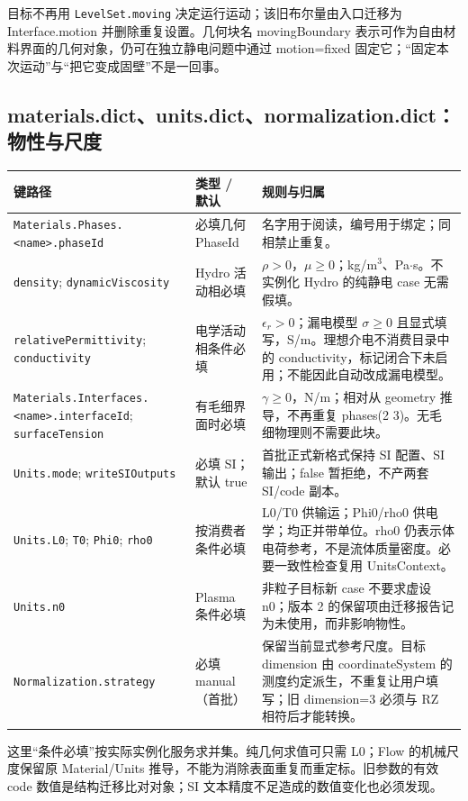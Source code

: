 \documentclass[UTF8,a4paper,11pt,fontset=fandol]{ctexart}
\numberwithin{equation}{section}
\newcommand{\code}[1]{\nolinkurl{#1}}
\begin{document}
目标不再用 \code{LevelSet.moving} 决定运行运动；该旧布尔量由入口迁移为 Interface.motion 并删除重复设置。几何块名 movingBoundary 表示可作为自由材料界面的几何对象，仍可在独立静电问题中通过 motion=fixed 固定它；“固定本次运动”与“把它变成固壁”不是一回事。

\subsection{materials.dict、units.dict、normalization.dict：物性与尺度}
\begin{longtable}{@{}P{.36\textwidth}P{.23\textwidth}P{.35\textwidth}@{}}
\toprule 键路径 & 类型 / 默认 & 规则与归属\\\midrule\endhead
\code{Materials.Phases.<name>.phaseId} & 必填几何 PhaseId & 名字用于阅读，编号用于绑定；同相禁止重复。\\
\code{density}; \code{dynamicViscosity} & Hydro 活动相必填 & $\rho>0$，$\mu\ge0$；kg/m$^3$、Pa$\cdot$s。不实例化 Hydro 的纯静电 case 无需假填。\\
\code{relativePermittivity}; \code{conductivity} & 电学活动相条件必填 & $\epsilon_r>0$；漏电模型 $\sigma\ge0$ 且显式填写，S/m。理想介电不消费目录中的 conductivity，标记闭合下未启用；不能因此自动改成漏电模型。\\
\code{Materials.Interfaces.<name>.interfaceId}; \code{surfaceTension} & 有毛细界面时必填 & $\gamma\ge0$，N/m；相对从 geometry 推导，不再重复 phases(2 3)。无毛细物理则不需要此块。\\
\code{Units.mode}; \code{writeSIOutputs} & 必填 SI；默认 true & 首批正式新格式保持 SI 配置、SI 输出；false 暂拒绝，不产两套 SI/code 副本。\\
\code{Units.L0}; \code{T0}; \code{Phi0}; \code{rho0} & 按消费者条件必填 & L0/T0 供输运；Phi0/rho0 供电学；均正并带单位。rho0 仍表示体电荷参考，不是流体质量密度。必要一致性检查复用 UnitsContext。\\
\code{Units.n0} & Plasma 条件必填 & 非粒子目标新 case 不要求虚设 n0；版本 2 的保留项由迁移报告记为未使用，而非影响物性。\\
\code{Normalization.strategy} & 必填 manual（首批） & 保留当前显式参考尺度。目标 dimension 由 coordinateSystem 的测度约定派生，不重复让用户填写；旧 dimension=3 必须与 RZ 相符后才能转换。\\
\bottomrule
\end{longtable}
这里“条件必填”按实际实例化服务求并集。纯几何求值可只需 L0；Flow 的机械尺度保留原 Material/Units 推导，不能为消除表面重复而重定标。旧参数的有效 code 数值是结构迁移比对对象；SI 文本精度不足造成的数值变化也必须发现。
\end{document}
